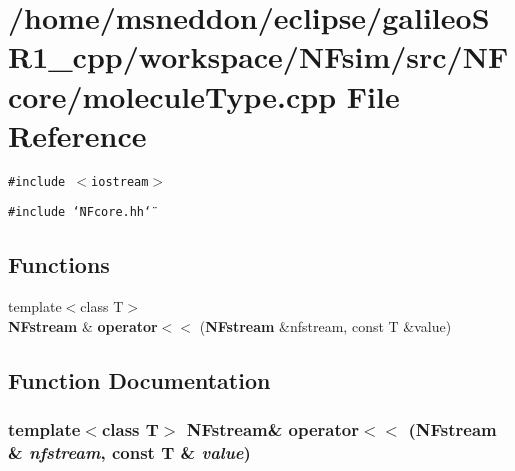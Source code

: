 \section{/home/msneddon/eclipse/galileoSR1\_\-cpp/workspace/NFsim/src/NFcore/moleculeType.cpp File Reference}
\label{moleculeType_8cpp}


{\tt \#include $<$iostream$>$}\par
{\tt \#include \char`\"{}NFcore.hh\char`\"{}}\par
\subsection*{Functions}
\begin{CompactItemize}
\item 
{\footnotesize template$<$class T$>$ }\\{\bf NFstream} \& {\bf operator$<$$<$} ({\bf NFstream} \&nfstream, const T \&value)
\end{CompactItemize}


\subsection{Function Documentation}
\subsubsection{\setlength{\rightskip}{0pt plus 5cm}template$<$class T$>$ {\bf NFstream}\& operator$<$$<$ ({\bf NFstream} \& {\em nfstream}, const T \& {\em value})\hspace{0.3cm}{\tt  [inline]}}\label{moleculeType_8cpp_ef588953052314e1b69285568a59947f}


